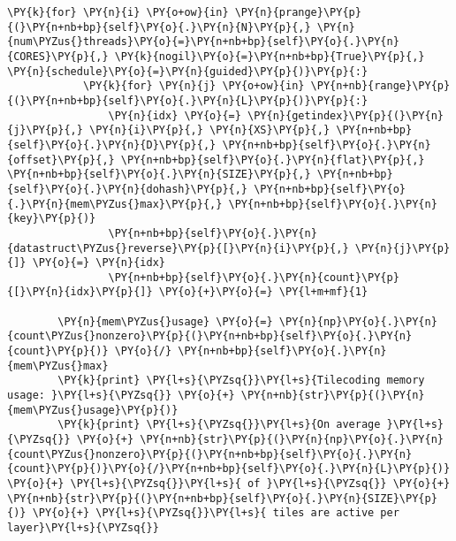 \begin{Verbatim}[commandchars=\\\{\}]
        \PY{k}{for} \PY{n}{i} \PY{o+ow}{in} \PY{n}{prange}\PY{p}{(}\PY{n+nb+bp}{self}\PY{o}{.}\PY{n}{N}\PY{p}{,} \PY{n}{num\PYZus{}threads}\PY{o}{=}\PY{n+nb+bp}{self}\PY{o}{.}\PY{n}{CORES}\PY{p}{,} \PY{k}{nogil}\PY{o}{=}\PY{n+nb+bp}{True}\PY{p}{,} \PY{n}{schedule}\PY{o}{=}\PY{n}{guided}\PY{p}{)}\PY{p}{:}
            \PY{k}{for} \PY{n}{j} \PY{o+ow}{in} \PY{n+nb}{range}\PY{p}{(}\PY{n+nb+bp}{self}\PY{o}{.}\PY{n}{L}\PY{p}{)}\PY{p}{:}
                \PY{n}{idx} \PY{o}{=} \PY{n}{getindex}\PY{p}{(}\PY{n}{j}\PY{p}{,} \PY{n}{i}\PY{p}{,} \PY{n}{XS}\PY{p}{,} \PY{n+nb+bp}{self}\PY{o}{.}\PY{n}{D}\PY{p}{,} \PY{n+nb+bp}{self}\PY{o}{.}\PY{n}{offset}\PY{p}{,} \PY{n+nb+bp}{self}\PY{o}{.}\PY{n}{flat}\PY{p}{,} \PY{n+nb+bp}{self}\PY{o}{.}\PY{n}{SIZE}\PY{p}{,} \PY{n+nb+bp}{self}\PY{o}{.}\PY{n}{dohash}\PY{p}{,} \PY{n+nb+bp}{self}\PY{o}{.}\PY{n}{mem\PYZus{}max}\PY{p}{,} \PY{n+nb+bp}{self}\PY{o}{.}\PY{n}{key}\PY{p}{)}
                \PY{n+nb+bp}{self}\PY{o}{.}\PY{n}{datastruct\PYZus{}reverse}\PY{p}{[}\PY{n}{i}\PY{p}{,} \PY{n}{j}\PY{p}{]} \PY{o}{=} \PY{n}{idx}
                \PY{n+nb+bp}{self}\PY{o}{.}\PY{n}{count}\PY{p}{[}\PY{n}{idx}\PY{p}{]} \PY{o}{+}\PY{o}{=} \PY{l+m+mf}{1}
        
        \PY{n}{mem\PYZus{}usage} \PY{o}{=} \PY{n}{np}\PY{o}{.}\PY{n}{count\PYZus{}nonzero}\PY{p}{(}\PY{n+nb+bp}{self}\PY{o}{.}\PY{n}{count}\PY{p}{)} \PY{o}{/} \PY{n+nb+bp}{self}\PY{o}{.}\PY{n}{mem\PYZus{}max}
        \PY{k}{print} \PY{l+s}{\PYZsq{}}\PY{l+s}{Tilecoding memory usage: }\PY{l+s}{\PYZsq{}} \PY{o}{+} \PY{n+nb}{str}\PY{p}{(}\PY{n}{mem\PYZus{}usage}\PY{p}{)}
        \PY{k}{print} \PY{l+s}{\PYZsq{}}\PY{l+s}{On average }\PY{l+s}{\PYZsq{}} \PY{o}{+} \PY{n+nb}{str}\PY{p}{(}\PY{n}{np}\PY{o}{.}\PY{n}{count\PYZus{}nonzero}\PY{p}{(}\PY{n+nb+bp}{self}\PY{o}{.}\PY{n}{count}\PY{p}{)}\PY{o}{/}\PY{n+nb+bp}{self}\PY{o}{.}\PY{n}{L}\PY{p}{)} \PY{o}{+} \PY{l+s}{\PYZsq{}}\PY{l+s}{ of }\PY{l+s}{\PYZsq{}} \PY{o}{+} \PY{n+nb}{str}\PY{p}{(}\PY{n+nb+bp}{self}\PY{o}{.}\PY{n}{SIZE}\PY{p}{)} \PY{o}{+} \PY{l+s}{\PYZsq{}}\PY{l+s}{ tiles are active per layer}\PY{l+s}{\PYZsq{}}
        

\end{Verbatim}
